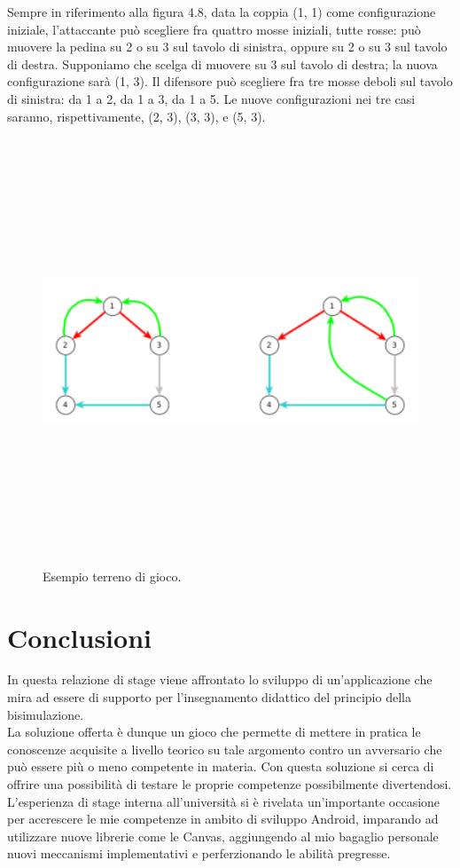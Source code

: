 \documentclass[a4paper,11pt,twoside,openright]{report}
\begin{document}
Sempre in riferimento alla figura 4.8, data la coppia (1, 1) come configurazione iniziale, l’attaccante può scegliere fra quattro mosse iniziali, tutte rosse: può muovere la pedina su 2 o su 3 sul tavolo di sinistra, oppure su 2 o su 3 sul tavolo di destra. Supponiamo che scelga di muovere su 3 sul tavolo di destra; la nuova configurazione
sarà (1, 3). Il difensore può scegliere fra tre mosse deboli sul tavolo di sinistra: da 1 a 2, da 1 a 3, da 1 a 5. Le nuove configurazioni nei tre casi saranno, rispettivamente,
(2, 3), (3, 3), e (5, 3).

\begin{figure}[h]
\centering
\includegraphics[width=\linewidth,height=360pt,keepaspectratio]{images/Rules.png}
\caption{Esempio terreno di gioco.}
\end{figure}

\chapter{Conclusioni}
In questa relazione di stage viene affrontato lo sviluppo di un'applicazione che mira ad essere di supporto per l'insegnamento didattico del principio della bisimulazione.\\
La soluzione offerta è dunque un gioco che permette di mettere in pratica le conoscenze acquisite a livello teorico su tale argomento contro un avversario che può essere più o meno competente in materia. Con questa soluzione si cerca di offrire una possibilità di testare le proprie competenze possibilmente divertendosi.\\
L'esperienza di stage interna all'università si è rivelata un'importante occasione per accrescere le mie competenze in ambito di sviluppo Android, imparando ad utilizzare nuove librerie come le Canvas, aggiungendo al mio bagaglio personale nuovi meccanismi implementativi e perferzionando le abilità pregresse.
\end{document}
